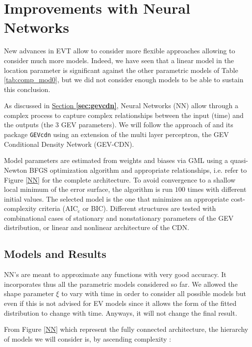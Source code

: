 \section{Improvements with Neural Networks}\label{sec:nnxp}


New advances in EVT allow to consider more flexible approaches allowing to consider much more models. Indeed, we have seen that a linear model in the location parameter is significant against the other parametric models of Table \ref{tab:comp_mod0}, but we did not consider enough models to be able to sustain this conclusion.

As discussed in \hyperref[sec:gevcdn]{Section\textbf{ \ref{sec:gevcdn}}}, Neural Networks (NN) allow through a complex process to capture complex relationships between the input (time) and the outputs (the 3 GEV parameters). We will follow the approach of \citet{cannon_flexible_2010} and its package \texttt{GEVcdn} using an extension of the multi layer perceptron, the GEV Conditional Density Network (GEV-CDN).

Model parameters are estimated from weights and biases via GML using a quasi-Newton BFGS optimization algorithm and appropriate relationships, i.e. refer to Figure \ref{NN} for the complete architecture. 
To avoid convergence to a shallow local minimum of the error surface, the algorithm is run $100$ times with different initial values.
The selected model is the one that minimizes an appropriate cost-complexity criteria ($\text{AIC}_{\text{c}}$ or BIC). Different structures are tested with combinational cases of stationary and nonstationary parameters of the GEV distribution, or linear and nonlinear architecture of the CDN. 


\subsection{Models and Results}


NN's are meant to approximate any functions with very good accuracy. It incorporates thus all the parametric models considered so far. We allowed the shape parameter $\xi$ to vary with time in order to consider all possible models but even if this is not advised for EV models since it allows the form of the fitted distribution to change with time. Anyways, it will not change the final result. 

From Figure \ref{NN} which represent the fully connected architecture, the hierarchy of models we will consider is, by ascending complexity :

